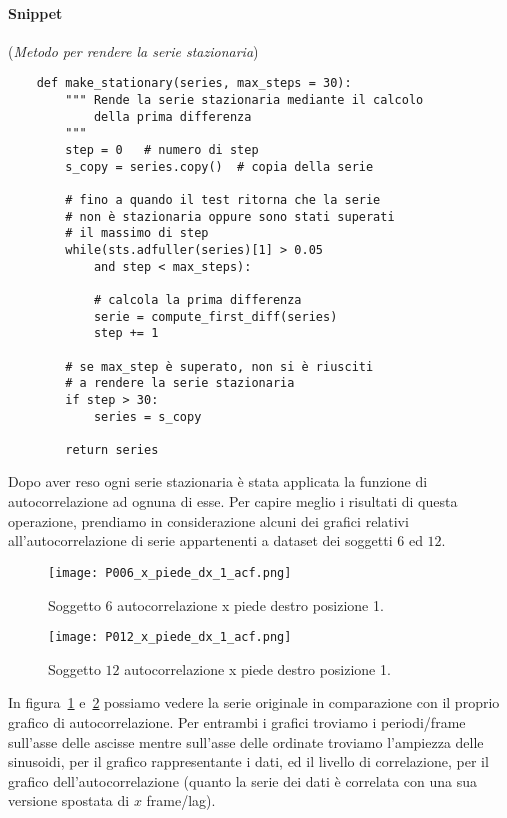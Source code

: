 \paragraph*{Snippet} (\textit{Metodo per rendere la serie stazionaria})
\begin{verbatim}
    def make_stationary(series, max_steps = 30):
        """ Rende la serie stazionaria mediante il calcolo
            della prima differenza
        """
        step = 0   # numero di step
        s_copy = series.copy()  # copia della serie
        
        # fino a quando il test ritorna che la serie
        # non è stazionaria oppure sono stati superati
        # il massimo di step
        while(sts.adfuller(series)[1] > 0.05 
            and step < max_steps):
            
            # calcola la prima differenza
            serie = compute_first_diff(series)
            step += 1

        # se max_step è superato, non si è riusciti
        # a rendere la serie stazionaria
        if step > 30:
            series = s_copy

        return series
\end{verbatim}

\begin{sloppypar}
Dopo aver reso ogni serie stazionaria è stata applicata la funzione di autocorrelazione ad ognuna di
esse. Per capire meglio i risultati di questa operazione, prendiamo in considerazione alcuni dei 
grafici relativi all'autocorrelazione di serie appartenenti a dataset dei soggetti $6$ ed $12$.
\end{sloppypar}

\begin{figure}[H]
    \centering
    \texttt{[image: P006\_x\_piede\_dx\_1\_acf.png]}
    \caption{Soggetto $6$ autocorrelazione x piede destro posizione 1.}
    \label{fig:P006_x_piede_dx_1_acf}
\end{figure}

\begin{figure}[H]
    \centering
    \texttt{[image: P012\_x\_piede\_dx\_1\_acf.png]}
    \caption{Soggetto $12$ autocorrelazione x piede destro posizione 1.}
    \label{fig:P012_x_piede_dx_1_acf}
\end{figure}

In figura~\ref{fig:P006_x_piede_dx_1_acf} e~\ref{fig:P012_x_piede_dx_1_acf} possiamo vedere
la serie originale in comparazione con il proprio grafico di autocorrelazione. Per entrambi
i grafici troviamo i periodi/frame sull'asse delle ascisse mentre sull'asse delle ordinate 
troviamo l'ampiezza delle sinusoidi, per il grafico rappresentante i dati, ed il livello 
di correlazione, per il grafico dell'autocorrelazione (quanto la serie dei dati è correlata
con una sua versione spostata di $x$ frame/lag).

